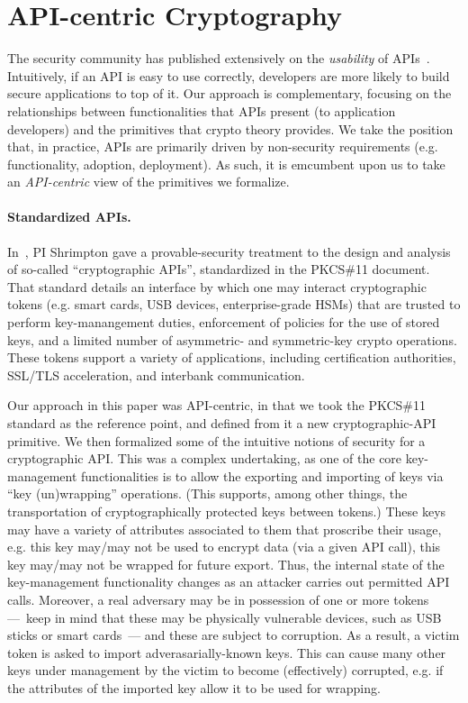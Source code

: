 \section{API-centric Cryptography}
The security community has published extensively on the \emph{usability} of
APIs~\cite{ABF+}. 
Intuitively, if an API is easy to use correctly, developers are more
likely to build secure applications to top of it.  
%
Our approach is complementary, focusing on the relationships between
functionalities that APIs present (to application developers) and the primitives
that crypto theory provides. We take the position that, in practice, APIs are
primarily driven by non-security requirements (e.g. functionality, adoption,
deployment).
%
As such, it is emcumbent upon us to take an \emph{API-centric} view of the
primitives we formalize.

\paragraph{Standardized APIs. }
In~\cite{SSW}, PI Shrimpton gave a provable-security treatment to the design and
analysis of so-called ``cryptographic APIs'', standardized in the PKCS\#11
document\cite{xxx}.  That standard details an interface by which one may interact
cryptographic tokens (e.g. smart cards, USB devices, enterprise-grade HSMs) that
are trusted to perform key-manangement duties, enforcement of policies for the
use of stored keys, and a limited number of asymmetric- and symmetric-key crypto
operations.  These tokens support a variety of applications, including
certification authorities, SSL/TLS acceleration, and interbank communication.

Our approach in this paper was API-centric, in that we took the PKCS\#11
standard as the reference point, and defined from it a new cryptographic-API
primitive.  We then formalized some of the intuitive notions of security for a
cryptographic API.  This was a complex undertaking, as one of the core
key-management functionalities is to allow the exporting and importing of keys
via ``key (un)wrapping'' operations.  (This supports, among other things, the
transportation of cryptographically protected keys between tokens.)  These keys
may have a variety of attributes associated to them that proscribe
their usage, e.g. this key may/may not be used to encrypt data (via a given API
call), this key may/may not be wrapped for future export.  Thus, the internal
state of the key-management functionality changes as an attacker carries out
permitted API calls.  
Moreover, a real adversary may be in possession of one or
more tokens ---~keep in mind that these may be physically vulnerable
devices, such as USB sticks or smart cards~--- and these are subject
to corruption.  As a result, a victim token is asked to
import adverasarially-known keys.  This can cause many other keys
under management by the victim to become (effectively) corrupted, 
e.g. if the attributes of the imported key allow it to be used for wrapping.

